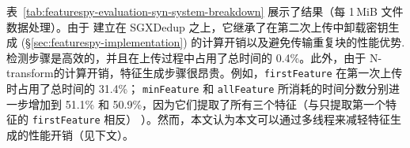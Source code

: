 \begin{table}[t]
    \small
    \centering
    \setlength{\tabcolsep}{5pt}
    \renewcommand{\arraystretch}{1.05}
    \caption{(Exp\#5) 处理随机文件数据每 1\,MiB 的时间分解（单位：ms）。 除括号中明确指定外，第二次上传的每一步所消耗的时间与第一次上传的相同。}
    \label{tab:featurespy-evaluation-syn-system-breakdown}
    \vspace{-6pt}
\end{table}
表~\ref{tab:featurespy-evaluation-syn-system-breakdown} 展示了结果（每 1\,MiB 文件数据处理）。由于 \prototype 建立在 SGXDedup \cite{ren21} 之上，它继承了在第二次上传中卸载密钥生成 (\S\ref{sec:featurespy-implementation}) 的计算开销以及避免传输重复块的性能优势.检测步骤是高效的，并且在上传过程中占用了总时间的 0.4\%。此外，由于 N-transform的计算开销，特征生成步骤很昂贵。例如，{\tt firstFeature} 在第一次上传时占用了总时间的 31.4\%； {\tt minFeature} 和 {\tt allFeature} 所消耗的时间分数分别进一步增加到 51.1\% 和 50.9\%，因为它们提取了所有三个特征（与只提取第一个特征的 {\tt firstFeature} 相反） ）。然而，本文认为本文可以通过多线程来减轻特征生成的性能开销（见下文）。


